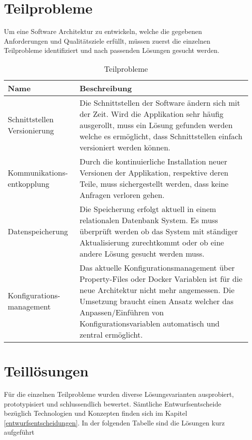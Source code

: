 \section{Teilprobleme}	

Um eine Software Architektur zu entwickeln, welche die gegebenen Anforderungen und Qualitätsziele erfüllt, müssen zuerst die einzelnen Teilprobleme identifiziert und nach passenden Lösungen gesucht werden.

\begin{table}[H]
	\centering
	\caption{Teilprobleme}
	\begin{tabular}{ | p{4cm} | p{11cm} | }
		\toprule
		{\textbf{Name}} & {\textbf{Beschreibung}} \\
		\midrule
		Schnittstellen Versionierung & Die Schnittstellen der Software ändern sich mit der Zeit. Wird die Applikation sehr häufig ausgerollt, muss ein Lösung gefunden werden welche es ermöglicht, dass Schnittstellen einfach versioniert werden können.\\ \hline
		Kommunikations- entkopplung &  Durch die kontinuierliche Installation neuer Versionen der Applikation, respektive deren Teile, muss sichergestellt werden, dass keine Anfragen verloren gehen.\\ \hline
		Datenspeicherung &  Die Speicherung erfolgt aktuell in einem relationalen Datenbank System. Es muss überprüft werden ob das System mit ständiger Aktualisierung zurechtkommt oder ob eine andere Lösung gesucht werden muss.\\ \hline
		Konfigurations- management & Das aktuelle Konfigurationsmanagement über Property-Files oder Docker Variablen ist für die neue Architektur nicht mehr angemessen. Die Umsetzung braucht einen Ansatz welcher das Anpassen/Einführen von Konfigurationsvariablen automatisch und zentral ermöglicht. \\
		\bottomrule
	\end{tabular}
\end{table}

\section{Teillösungen}

Für die einzelnen Teilprobleme wurden diverse Lösungsvarianten ausprobiert, prototypisiert und schlussendlich bewertet. Sämtliche Entwurfsentscheide bezüglich Technologien und Konzepten finden sich im Kapitel \ref{entwurfsentscheidungen}. In der folgenden Tabelle sind die Lösungen kurz aufgeführt

